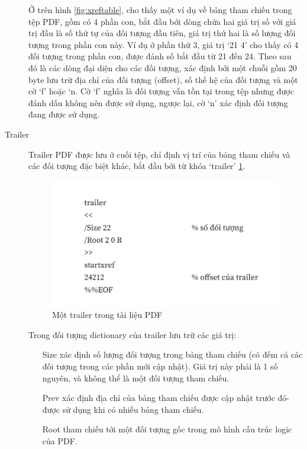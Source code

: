 \documentclass[./../main.tex]{subfiles}
\begin{document}
\begin{description}
	      Ở trên hình \ref{fig:xreftable}, cho thấy một ví dụ về bảng tham chiếu trong tệp PDF, gồm có 4 phần con, bắt đầu bởi dòng chứa hai giá trị số với giá trị đầu là số thứ tự của đối tượng đầu tiên, giá trị thứ hai là số lượng đối tượng trong phần con này. Ví dụ ở phần thứ 3, giá trị ‘21 4’ cho thấy có 4 đối tượng trong phần con, được đánh số bắt đầu từ 21 đến 24. Theo sau đó là các dòng đại diện cho các đối tượng, xác định bởi một chuỗi gồm 20 byte lưu trữ địa chỉ của đối tượng (offset), số thế hệ của đối tượng và một cờ ‘f’ hoặc ‘n. Cờ ‘f’ nghĩa là đối tượng vẫn tồn tại trong tệp nhưng được đánh dấu không nên được sử dụng, ngược lại, cờ ‘n’ xác định đối tượng đang được sử dụng.
	\item[Trailer]

	      Trailer PDF được lưu ở cuối tệp, chỉ định vị trí của bảng tham chiếu và các đối tượng đặc biệt khác, bắt đầu bởi từ khóa ‘trailer’ \ref{fig:trailer}.

	      \begin{figure}[ht!]
		      \includegraphics[width=\linewidth]{./images/img_trailer_pdf.png}
		      \caption{Một trailer trong tài liệu PDF}
		      \label{fig:trailer}
	      \end{figure}

	      Trong đối tượng dictionary của trailer lưu trữ các giá trị:

	      \begin{itemize}
		      \item[Size] xác định số lượng đối tượng trong bảng tham chiếu (có đếm cả các đối tượng trong các phần mới cập nhật). Giá trị này phải là 1 số nguyên, và không thể là một đối tượng tham chiếu.
		      \item[Prev] xác định địa chỉ của bảng tham chiếu được cập nhật trước đó- được sử dụng khi có nhiều bảng tham chiếu.
		      \item[Root] tham chiếu tới một đối tượng gốc trong mô hình cấu trúc logic của PDF.
	      \end{itemize}

\end{description}
\end{document}
